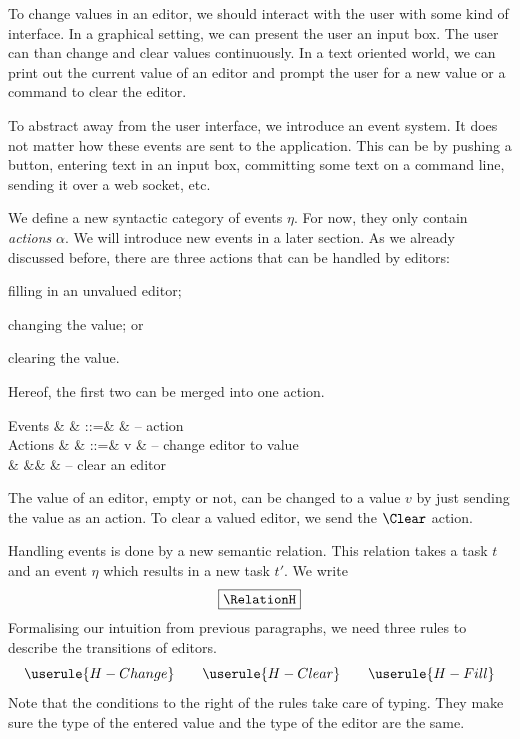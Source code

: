 To change values in an editor,
we should interact with the user with some kind of interface.
In a graphical setting,
we can present the user an input box.
The user can than change and clear values continuously.
In a text oriented world,
we can print out the current value of an editor
and prompt the user for a new value
or a command to clear the editor.

To abstract away from the user interface,
we introduce an event system.
It does not matter how these events are sent to the application.
This can be by pushing a button,
entering text in an input box,
committing some text on a command line,
sending it over a web socket,
etc.

We define a new syntactic category of events $\eta$.
For now, they only contain \emph{actions} $\alpha$.
We will introduce new events in a later section.
As we already discussed before,
there are three actions that can be handled by editors:
\begin{enumerate*}
  \item filling in an unvalued editor;
  \item changing the value; or
  \item clearing the value.
\end{enumerate*}
Hereof, the first two can be merged into one action.
\begin{grammar}
  Events
    & \eta   & ::=& \alpha & – action \\
  Actions
    & \alpha & ::=& v      & – change editor to value \\
    &        &\mid& \Clear & – clear an editor \\
\end{grammar}
The value of an editor, empty or not, can be changed to a value $v$ by just sending the value as an action.
To clear a valued editor, we send the $\Clear$ action.

Handling events is done by a new semantic relation.
This relation takes a task $t$ and an event $\eta$ which results in a new task $t'$.
We write
\begin{equation*}
  \boxed{\RelationH}
\end{equation*}
Formalising our intuition from previous paragraphs,
we need three rules to describe the transitions of editors.
\begin{equation*}
  \userule{H-Change} \qquad \userule{H-Clear} \qquad \userule{H-Fill}
\end{equation*}
Note that the conditions to the right of the rules take care of typing.
They make sure the type of the entered value and the type of the editor are the same.


